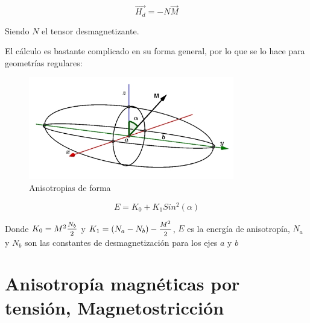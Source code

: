 \begin{equation}
	\overrightarrow{H_{d}}= -N \overrightarrow{M}
\end{equation}

Siendo $N$ el tensor desmagnetizante.

El cálculo es bastante complicado en su forma general, por lo que se lo hace para geometrías regulares:


\begin{figure}[H]
    \centering
    \includegraphics[width=0.8\textwidth]{./Figures/anisotropiasDeForma}
	\caption{Anisotropias de forma}
	\label{fig:anisotropiasDeForma}
\end{figure}

\begin{equation}
	E=K_{0}+K_{1} Sin^{2}(\alpha)
\end{equation}

Donde $K_{0}= M^{2}\mfrac{N_{b}}{2}$ y $K_{1}=(N_{a}-N_{b})-\mfrac{M^{2}}{2}$, $E$ es la energía de anisotropía, $N_{a}$ y $N_{b}$ son las constantes de desmagnetización para los ejes $a$ y $b$

\section{Anisotropía magnéticas por tensión, Magnetostricción}

